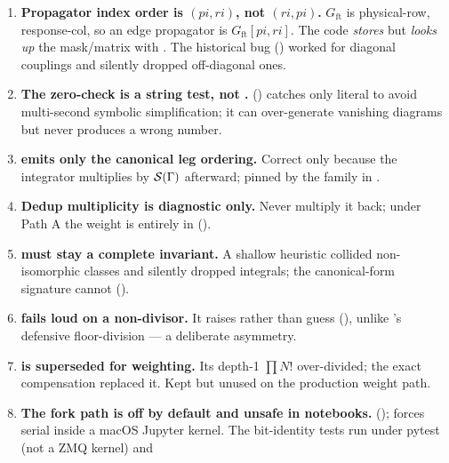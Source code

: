 \begin{enumerate}
  \item \textbf{Propagator index order is $(pi, ri)$, not $(ri, pi)$.}
        $G_{\mathrm{ft}}$ is physical-row, response-col, so an edge propagator is
        $G_{\mathrm{ft}}[pi, ri]$. The code \emph{stores}
         but \emph{looks up} the mask/matrix
        with . The historical \code{[ri, pi]} bug
        () worked for diagonal couplings and
        silently dropped off-diagonal ones.
  \item \textbf{The zero-check is a string test, not .}
         () catches
        only literal  to avoid multi-second symbolic simplification;
        it can over-generate vanishing diagrams but never produces a wrong number.
  \item \textbf{ emits only the canonical leg ordering.}
        Correct only because the integrator multiplies by $\mathcal{S}(\Gamma)$
        afterward; pinned by the  family in
        .
  \item \textbf{Dedup multiplicity is diagnostic only.} Never multiply it back;
        under Path A the weight is entirely in 
        ().
  \item \textbf{ must stay a complete invariant.} A
        shallow heuristic collided non-isomorphic classes and silently dropped
        integrals; the canonical-form signature cannot
        ().
  \item \textbf{ fails loud on a non-divisor.}
        It raises rather than guess (), unlike
        's defensive floor-division --- a deliberate
        asymmetry.
  \item \textbf{ is superseded for weighting.} Its
        depth-1 $\prod N!$ over-divided; the exact compensation replaced it. Kept
        but unused on the production weight path.
  \item \textbf{The fork path is off by default and unsafe in notebooks.}
         ();
         forces serial inside a macOS Jupyter
        kernel. The bit-identity tests run under pytest (not a ZMQ kernel) and

\end{enumerate}
